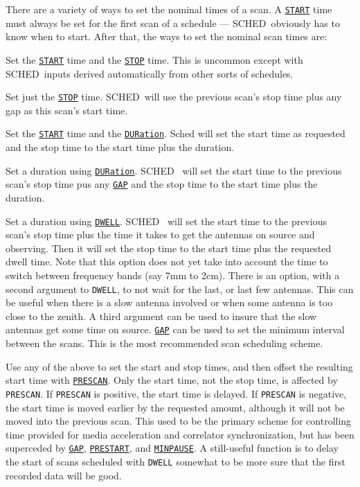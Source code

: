 \documentclass{report}
\newcommand{\schedb}{{\sc SCHED~}}
\begin{document}
There are a variety of ways to set the nominal times of a scan.  A
{\hyperref[MP:START]{{\tt START}}} time must always be set for the first
scan of a schedule --- \schedb obviously has to know when to start.
After that, the ways to set the nominal scan times are:

\begin{list}{}{\parsep 0em  \itemsep 0em }

\item Set the 
{\hyperref[MP:START]{{\tt START}}} time and the
{\hyperref[MP:STOP]{{\tt STOP}}} time.  This is uncommon except with
\schedb inputs derived automatically from other sorts of schedules.

\item Set just the 
{\hyperref[MP:STOP]{{\tt STOP}}} time.  \schedb will
use the previous scan's stop time plus any gap as this scan's start
time.

\item Set the 
{\hyperref[MP:START]{{\tt START}}} time and the
{\hyperref[MP:DUR]{{\tt DURation}}}.  Sched will set the start time as
requested and the stop time to the start time plus the duration.

\item Set a duration using 
{\hyperref[MP:DUR]{{\tt DURation}}}.  \schedb
will set the start time to the previous scan's stop time pus any
{\hyperref[MP:GAP]{{\tt GAP}}} and the stop time to the start time 
plus the duration.

\item Set a duration using 
{\hyperref[MP:DWELL]{{\tt DWELL}}}.  \schedb
will set the start time to the previous scan's stop time plus the time
it takes to get the antennas on source and observing.  Then it will
set the stop time to the start time plus the requested dwell time.
Note that this option does not yet take into account the time to
switch between frequency bands (say 7mm to 2cm).  There is an option,
with a second argument to {\tt DWELL}, to not wait for the last, or
last few antennas.  This can be useful when there is a slow antenna
involved or when some antenna is too close to the zenith.  A third
argument can be used to insure that the slow antennas get some time on
source. 
{\hyperref[MP:GAP]{{\tt GAP}}} can be used to set the minimum
interval between the scans.  This is the most recommended scan
scheduling scheme.

\item Use any of the above to set the start and stop times, and then
offset the resulting start time with 
{\hyperref[MP:PRESCAN]{{\tt PRESCAN}}}.
Only the start time, not the stop time, is
affected by {\tt PRESCAN}.  If {\tt PRESCAN} is positive, the start
time is delayed.  If {\tt PRESCAN} is negative, the start time is
moved earlier by the requested amount, although it will not be moved
into the previous scan.  This used to be the primary scheme for
controlling time provided for media acceleration and correlator
synchronization, but has been superceded by 
{\hyperref[MP:GAP]{{\tt GAP}}}, 
{\hyperref[MP:PRESTART]{{\tt PRESTART}}}, and
{\hyperref[MP:MINPAUSE]{{\tt MINPAUSE}}}.  A still-useful function is
to delay the start of scans scheduled with {\tt DWELL} somewhat to
be more sure that the first recorded data will be good.


\end{list}
\end{document}
